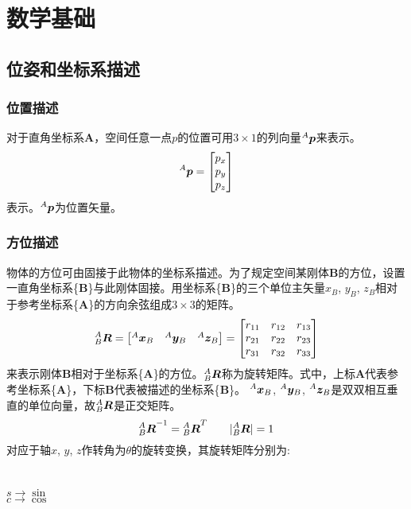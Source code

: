 \chapter{数学基础}
\section{位姿和坐标系描述}
\subsection{位置描述}
对于直角坐标系\textbf{A}，空间任意一点$p$的位置可用$3 \times 1$的列向量$\zsb{p}{A}$来表示。
\begin{equation}
\zsb{p}{A}=
\begin{bmatrix}
p_x\\
p_y\\
p_z
\end{bmatrix}
\end{equation}
表示。$\zsb{p}{A}$为位置矢量。
\subsection{方位描述}
物体的方位可由固接于此物体的坐标系描述。为了规定空间某刚体\textbf{B}的方位，设置一直角坐标系\{\textbf{B}\}与此刚体固接。用坐标系\{\textbf{B}\}的三个单位主矢量$x_B$, $y_B$, $z_B$相对于参考坐标系\{\textbf{A}\}的方向余弦组成$3 \times 3$的矩阵。
\begin{equation}
\zb{R}{A}{B}=
\begin{bmatrix}
\djb{x}{A}{B} & \djb{y}{A}{B} & \djb{z}{A}{B}
\end{bmatrix}
=
\begin{bmatrix}
r_{11} & r_{12} & r_{13}\\
r_{21} & r_{22} & r_{23}\\
r_{31} & r_{32} & r_{33}
\end{bmatrix}
\end{equation}
来表示刚体\textbf{B}相对于坐标系\{\textbf{A}\}的方位。$\zb{R}{A}{B}$称为旋转矩阵。式中，上标\textbf{A}代表参考坐标系\{\textbf{A}\}，下标\textbf{B}代表被描述的坐标系\{\textbf{B}\}。
$\djb{x}{A}{B}$, $\djb{y}{A}{B}$, $\djb{z}{A}{B}$是双双相互垂直的单位向量，故$\zb{R}{A}{B}$是正交矩阵。
\[
{\zb{R}{A}{B}}^{-1}={\zb{R}{A}{B}}^T \qquad |\zb{R}{A}{B}|=1
\]
对应于轴$x$, $y$, $z$作转角为$\theta$的旋转变换，其旋转矩阵分别为:
\rotx\\
\roty\\
\rotz\\
$s \rightarrow \sin$\\
$c \rightarrow \cos$
